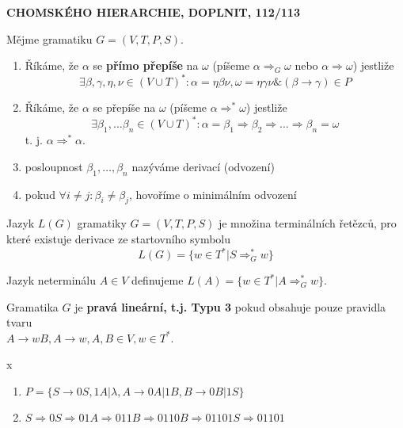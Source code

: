 \documentclass[../main.tex]{subfiles}
\begin{document}
\begin{definition}
    \textbf{CHOMSKÉHO HIERARCHIE, DOPLNIT, 112/113}
\end{definition}

\begin{definition}
    Mějme gramatiku $G = (V,T,P,S)$.
    \begin{enumerate}
        \item Říkáme, že $\alpha$ se \textbf{přímo přepíše} na $\omega$ (píšeme $\alpha \Rightarrow_{G}\omega$
        nebo $\alpha \Rightarrow \omega$) jestliže 
        \[\exists \beta,\gamma,\eta ,\nu \in (V \cup T)^* : \alpha = \eta \beta \nu, \omega = \eta \gamma \nu \& (\beta \rightarrow \gamma) \in P\]
        \item Říkáme, že $\alpha$ se přepíše na $\omega$ (píšeme $\alpha \Rightarrow^* \omega$) jestliže
        \[\exists \beta_1,\dots \beta_n \in (V \cup T)^* : \alpha = \beta_1 \Rightarrow \beta_2 \Rightarrow \dots \Rightarrow \beta_n = \omega\]
        t. j. $\alpha \Rightarrow^* \alpha$.
        \item posloupnost $\beta_1,\dots , \beta_n$ nazýváme derivací (odvození)
        \item pokud $\forall i \neq j : \beta_i \neq \beta_j$, hovoříme o minimálním odvození
    \end{enumerate}
\end{definition}

\begin{definition}
    Jazyk $L(G)$ gramatiky $G = (V,T,P,S)$ je množina terminálních řetězců, pro které existuje derivace ze startovního symbolu
    \[L(G) = \{w \in T^* |S \Rightarrow^*_G w\}\]

    Jazyk neterminálu $A \in V$ definujeme $L(A) = \{w \in T^* | A \Rightarrow^*_G w\}$.
\end{definition}

\begin{definition}
    Gramatika $G$ je \textbf{pravá lineární, t.j. Typu 3} pokud obsahuje pouze pravidla tvaru\\

    $A \rightarrow wB,A\rightarrow w, A,B \in V, w \in T^*$.
\end{definition}

\begin{example}
    {\color{white} x}

    \begin{enumerate}
        \item $P = \{S \rightarrow 0S, 1A|\lambda, A\rightarrow 0A|1B, B\rightarrow 0B|1S\}$
        \item $S \Rightarrow 0S \Rightarrow 01A \Rightarrow 011B \Rightarrow 0110B \Rightarrow 01101S \Rightarrow 01101$
    \end{enumerate}
\end{example}
\end{document}
